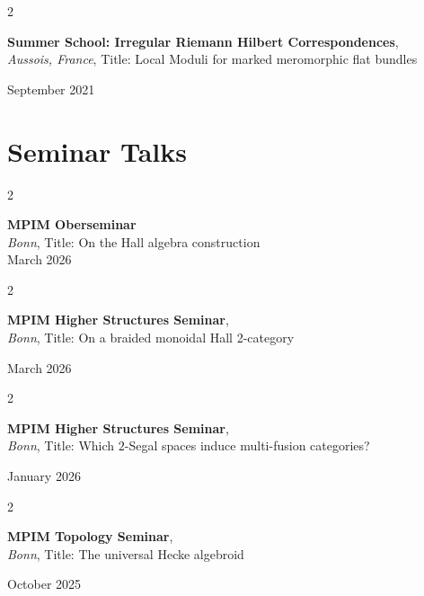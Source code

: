 \documentclass[10pt, letterpaper]{article}
\newenvironment{twocolentry}[2][]{
    \onecolentry
    \def\secondColumn{#2}
    \setcolumnwidth{\fill, 4.5 cm}
    \begin{paracol}{2}
}{
    \switchcolumn \raggedleft \secondColumn
    \end{paracol}
    \endonecolentry
} %
\begin{document}
 \vspace{0.2cm}

 \begin{twocolentry}{

    September 2021
           
        }
            \textbf{Summer School: Irregular Riemann Hilbert Correspondences}, \\
            \textit{Aussois, France},  Title: Local Moduli for marked meromorphic flat bundles
            
           
        \end{twocolentry}
        
 \vspace{0.2cm}

    
    \section{Seminar Talks}

        
\begin{twocolentry}{March 2026}
    \textbf{MPIM Oberseminar} \\
    \textit{Bonn}, Title: On the Hall algebra construction\\
\end{twocolentry}
 \vspace{0.2cm}

    \begin{twocolentry}{March 2026}
        \textbf{MPIM Higher Structures Seminar},\\
    \textit{Bonn}, Title: On a braided monoidal Hall 2-category
    \end{twocolentry}

 \vspace{0.2cm}


    \begin{twocolentry}{January 2026}
        \textbf{MPIM Higher Structures Seminar},\\
    \textit{Bonn}, Title: Which $2$-Segal spaces induce multi-fusion categories?
    \end{twocolentry}

 \vspace{0.2cm}


         \begin{twocolentry}{October 2025}
    \textbf{MPIM Topology Seminar},\\
    \textit{Bonn}, Title: The universal Hecke algebroid
    \end{twocolentry}
\end{document}

